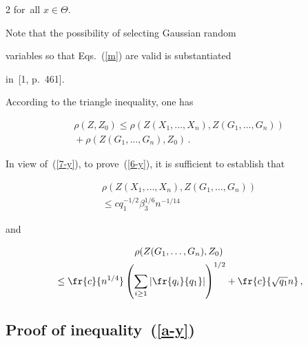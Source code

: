 \begin{multicols}{2}
for~all $x\in\Theta$.

    Note that the possibility of selecting Gaussian random

    variables so that Eqs.~(\ref{m}) are valid is substantiated

    in~[1, p.~461].



     According to the triangle inequality, one has

     \begin{multline}

     \label{7-y}

    \rho (Z,Z_0)\leq \rho(Z(X_1,\ldots,X_n),Z(G_1,\ldots,G_n))\\

    {}+\rho(Z(G_1,\ldots,G_n),Z_0)\,.

     \end{multline}

     In view of~(\ref{7-y}), to prove~(\ref{6-y}),  it is sufficient to establish that

     \begin{multline}

   \rho(Z(X_1,\ldots,X_n),Z(G_1,\ldots,G_n))\\

   {}\leq cq_1^{-1/2}\beta_3^{1/6}n^{-1/14}

        \label{a-y}

     \end{multline}

     and

    \begin{multline}

   \rho(Z(G_1,\ldots,G_n),Z_0)\\

   {}\leq \fr{c}{n^{1/4}}

    \left(\sum\limits_{i\geq 1}\left\vert\fr{q_i}{q_1}\right\vert\right)^{1/2}

+

    \fr{c}{\sqrt{q_1}n}\,,

        \label{b}

     \end{multline}



     \subsection{Proof of inequality~(\ref{a-y})}




\end{multicols}
